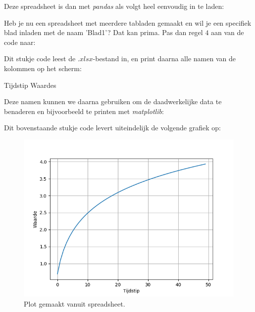 Deze spreadsheet is dan met \textit{pandas} als volgt heel eenvoudig in te laden:

\begin{remark}
Heb je nu een spreadsheet met meerdere tabladen gemaakt en wil je een specifiek blad inladen met de naam 'Blad1'? Dat kan prima. Pas dan regel $4$ aan van de code naar: 

\end{remark}

Dit stukje code leest de $.xlsx$-bestand in, en print daarna alle namen van de kolommen op het scherm:
\begin{python}
Tijdstip
Waardes
\end{python}

Deze namen kunnen we daarna gebruiken om de daadwerkelijke data te benaderen en bijvoorbeeld te printen met \textit{matplotlib}:


Dit bovenstaande stukje code levert uiteindelijk de volgende grafiek op:

\begin{figure}[!ht]
\centering\includegraphics[scale=0.7]{Pictures/chapter07/plot3.png}
\caption{Plot gemaakt vanuit spreadsheet.}
\label{fig:plot3} %
\end{figure}

\newpage

